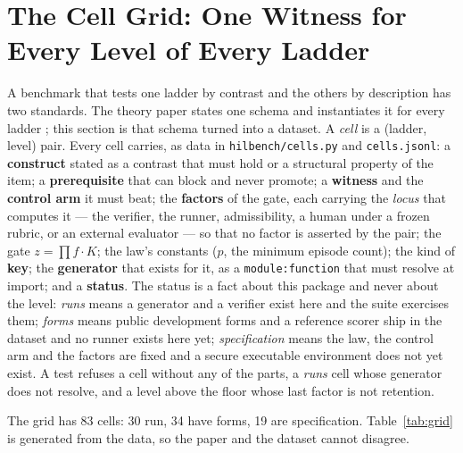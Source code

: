 \section{The Cell Grid: One Witness for Every Level of Every Ladder}\label{sec:grid}

A benchmark that tests one ladder by contrast and the others by description has two standards. The theory paper states one schema and instantiates it for every ladder \citep{yang2026unified}; this section is that schema turned into a dataset. A \emph{cell} is a (ladder, level) pair. Every cell carries, as data in \texttt{hilbench/cells.py} and \texttt{cells.jsonl}: a \textbf{construct} stated as a contrast that must hold or a structural property of the item; a \textbf{prerequisite} that can block and never promote; a \textbf{witness} and the \textbf{control arm} it must beat; the \textbf{factors} of the gate, each carrying the \emph{locus} that computes it --- the verifier, the runner, admissibility, a human under a frozen rubric, or an external evaluator --- so that no factor is asserted by the pair; the gate $z = \prod f \cdot K$; the law's constants ($p$, the minimum episode count); the kind of \textbf{key}; the \textbf{generator} that exists for it, as a \texttt{module:function} that must resolve at import; and a \textbf{status}. The status is a fact about this package and never about the level: \emph{runs} means a generator and a verifier exist here and the suite exercises them; \emph{forms} means public development forms and a reference scorer ship in the dataset and no runner exists here yet; \emph{specification} means the law, the control arm and the factors are fixed and a secure executable environment does not yet exist. A test refuses a cell without any of the parts, a \emph{runs} cell whose generator does not resolve, and a level above the floor whose last factor is not retention.

The grid has 83 cells: 30 run, 34 have forms, 19 are specification. Table~\ref{tab:grid} is generated from the data, so the paper and the dataset cannot disagree.



